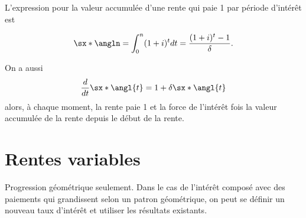 L'expression pour la valeur accumulée d'une rente qui paie 1 par période d'intérêt est 

$$\sx*{\angln} = \int_{0}^{n}(1 + i)^t dt = \frac{(1+i)^t - 1}{\delta}.$$

On a aussi
$$\frac{d}{dt}\sx*{\angl{t}} = 1 + \delta \sx*{\angl{t}}$$
alors, à chaque moment, la rente paie 1 et la force de l'intérêt fois la valeur accumulée de la rente depuis le début de la rente. 


\section{Rentes variables}

Progression géométrique seulement. Dans le cas de l'intérêt composé avec des paiements qui grandissent selon un patron géométrique, on peut se définir un nouveau taux d'intérêt et utiliser les résultats existants. 




















